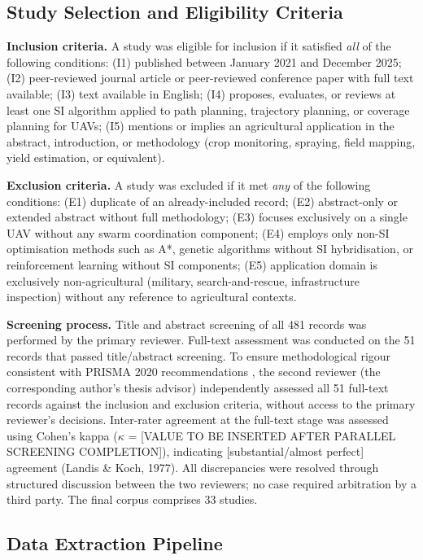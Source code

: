 \documentclass[review,3p,times]{elsarticle}
\begin{document}
\subsection{Study Selection and Eligibility Criteria}

\textbf{Inclusion criteria.} A study was eligible for inclusion if it satisfied \textit{all} of the following conditions: (I1) published between January 2021 and December 2025; (I2) peer-reviewed journal article or peer-reviewed conference paper with full text available; (I3) text available in English; (I4) proposes, evaluates, or reviews at least one SI algorithm applied to path planning, trajectory planning, or coverage planning for UAVs; (I5) mentions or implies an agricultural application in the abstract, introduction, or methodology (crop monitoring, spraying, field mapping, yield estimation, or equivalent).

\textbf{Exclusion criteria.} A study was excluded if it met \textit{any} of the following conditions: (E1) duplicate of an already-included record; (E2) abstract-only or extended abstract without full methodology; (E3) focuses exclusively on a single UAV without any swarm coordination component; (E4) employs only non-SI optimisation methods such as A*, genetic algorithms without SI hybridisation, or reinforcement learning without SI components; (E5) application domain is exclusively non-agricultural (military, search-and-rescue, infrastructure inspection) without any reference to agricultural contexts.

\textbf{Screening process.} Title and abstract screening of all 481 records was performed by the primary reviewer. Full-text assessment was conducted on the 51 records that passed title/abstract screening. To ensure methodological rigour consistent with PRISMA 2020 recommendations \cite{page2021}, the second reviewer (the corresponding author's thesis advisor) independently assessed all 51 full-text records against the inclusion and exclusion criteria, without access to the primary reviewer's decisions. Inter-rater agreement at the full-text stage was assessed using Cohen's kappa ($\kappa$ = [VALUE TO BE INSERTED AFTER PARALLEL SCREENING COMPLETION]), indicating [substantial/almost perfect] agreement (Landis \& Koch, 1977). All discrepancies were resolved through structured discussion between the two reviewers; no case required arbitration by a third party. The final corpus comprises 33 studies.

\subsection{Data Extraction Pipeline}
\end{document}
